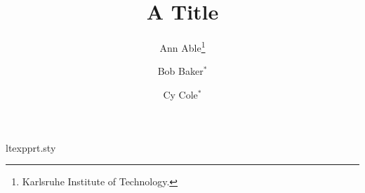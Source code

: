\begin{filecontents*}[overwrite]{ltexpprt.sty}
\renewcommand\maketitle{\par
  \begingroup
    \renewcommand\thefootnote{\@fnsymbol\c@footnote}%
    \def\@makefnmark{\rlap{\@textsuperscript{\normalfont\@thefnmark}}}%
    \if@twocolumn
      \ifnum \col@number=\@ne
        \@maketitle
      \else
        \twocolumn[\@maketitle]%
      \fi
    \else
      \newpage
      \@maketitle
    \fi
    \thispagestyle{empty}\@thanks
  \endgroup
  \setcounter{footnote}{0}%
  \global\let\thanks\relax
  \global\let\maketitle\relax}
\end{filecontents*}
\documentclass[twoside,leqno,twocolumn]{article}
\usepackage{ltexpprt}
\title{A Title}
\author{Ann Able\thanks{Karlsruhe Institute of Technology.}
\and
Bob Baker$^*$
\and
Cy Cole$^*$}

\maketitle
Body text.

